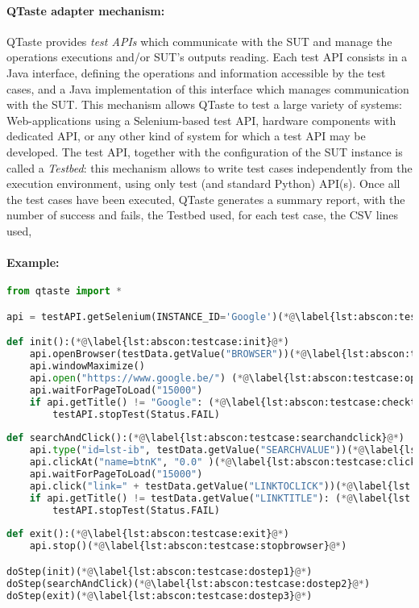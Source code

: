 \paragraph{QTaste adapter mechanism:}

QTaste provides \textit{test APIs} which communicate with the \gls{SUT} and manage the  operations executions and/or SUT's outputs reading. Each test API consists in a Java interface, defining the operations and information accessible by the test cases, and a Java implementation of this interface which manages communication with the SUT. 
This mechanism allows QTaste to test a large variety of systems: Web-applications using a Selenium-based test API, hardware components with dedicated API, or any other kind of system for which a test API may be developed. The test API, together with the configuration of the SUT instance is called a \emph{Testbed}: this mechanism allows to write test cases independently from the execution environment, using only test (and standard Python) API(s). 
Once all the test cases have been executed, QTaste generates a summary report, with the number of success and fails, the Testbed used, for each test case, the CSV lines used, \etc


\paragraph{Example:}

\begin{lstlisting}[language=Python,
float,
label=lst:abscon:testcase,
caption={Google search test case}]
from qtaste import *

api = testAPI.getSelenium(INSTANCE_ID='Google')(*@\label{lst:abscon:testcase:selenium}@*)

def init():(*@\label{lst:abscon:testcase:init}@*)
	api.openBrowser(testData.getValue("BROWSER"))(*@\label{lst:abscon:testcase:openbrowser}@*)
	api.windowMaximize()
	api.open("https://www.google.be/") (*@\label{lst:abscon:testcase:openurl}@*)
	api.waitForPageToLoad("15000") 
	if api.getTitle() != "Google": (*@\label{lst:abscon:testcase:checktitle}\label{lst:abscon:testcase:gettitle}@*)
		testAPI.stopTest(Status.FAIL)
    
def searchAndClick():(*@\label{lst:abscon:testcase:searchandclick}@*)
	api.type("id=lst-ib", testData.getValue("SEARCHVALUE"))(*@\label{lst:abscon:testcase:type}@*)  
	api.clickAt("name=btnK", "0.0" )(*@\label{lst:abscon:testcase:click1}@*)
	api.waitForPageToLoad("15000")
	api.click("link=" + testData.getValue("LINKTOCLICK"))(*@\label{lst:abscon:testcase:click2}@*)
	if api.getTitle() != testData.getValue("LINKTITLE"): (*@\label{lst:abscon:testcase:checklinktitle}@*)
		testAPI.stopTest(Status.FAIL)
		
def exit():(*@\label{lst:abscon:testcase:exit}@*)
	api.stop()(*@\label{lst:abscon:testcase:stopbrowser}@*)

doStep(init)(*@\label{lst:abscon:testcase:dostep1}@*)
doStep(searchAndClick)(*@\label{lst:abscon:testcase:dostep2}@*)
doStep(exit)(*@\label{lst:abscon:testcase:dostep3}@*)
\end{lstlisting}

